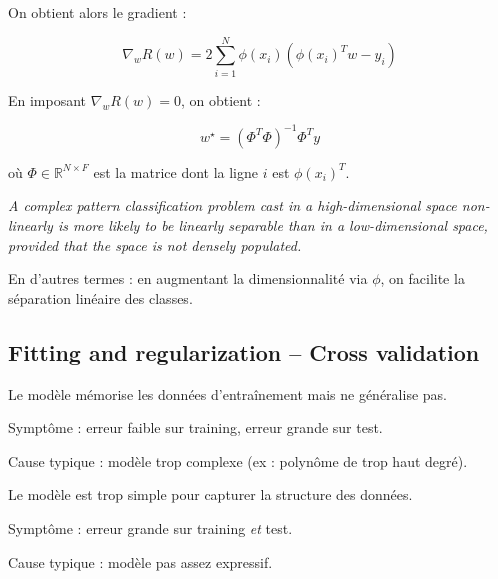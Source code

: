\documentclass[11pt,a4paper,openany]{book}
\begin{document}
On obtient alors le gradient :

\[
\nabla_w R(w)
=
2
\sum_{i=1}^{N}
\phi(x_i)
\left(
\phi(x_i)^T w - y_i
\right)
\]

\vspace{0.6cm}

En imposant $\nabla_w R(w) = 0$, on obtient :

\[
w^\star
=
(\Phi^T \Phi)^{-1}\Phi^T y
\]

où $\Phi \in \mathbb{R}^{N \times F}$ est la matrice dont la ligne $i$ est $\phi(x_i)^T$.

\begin{thmbox}[title=Cover's theorem]
\textit{
A complex pattern classification problem cast in a high-dimensional space non-linearly is more likely to be linearly separable than in a low-dimensional space, provided that the space is not densely populated.
}

\vspace{0.3cm}

En d'autres termes : en augmentant la dimensionnalité via $\phi$, on facilite la séparation linéaire des classes.
\end{thmbox}
\vspace{8cm}

\subsection{Fitting and regularization -- Cross validation}

\begin{defnbox}[title=Definition: Overfitting]
Le modèle mémorise les données d'entraînement mais ne généralise pas.

\vspace{0.2cm}

Symptôme : erreur faible sur training, erreur grande sur test.

\vspace{0.2cm}

Cause typique : modèle trop complexe (ex : polynôme de trop haut degré).
\end{defnbox}

\vspace{0.5cm}

\begin{defnbox}[title=Definition: Underfitting]
Le modèle est trop simple pour capturer la structure des données.

\vspace{0.2cm}

Symptôme : erreur grande sur training \textit{et} test.

\vspace{0.2cm}

Cause typique : modèle pas assez expressif.
\end{defnbox}
\end{document}
